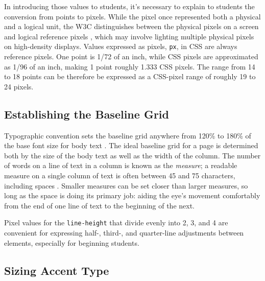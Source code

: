 \documentclass[sigplan,screen]{acmart}
\begin{document}
In introducing those values to students, it’s necessary to explain to students the conversion from points to pixels. While the pixel once represented both a physical and a logical unit, the W3C distinguishes between the physical pixels on a screen and logical reference pixels \cite[§~5.2]{w3c:values}, which may involve lighting multiple physical pixels on high-density displays. Values expressed as pixels, \verb|px|, in CSS are always reference pixels. One point is 1/72 of an inch, while CSS pixels are approximated as 1/96 of an inch, making 1 point roughly 1.333 CSS pixels. The range from 14 to 18 points can be therefore be expressed as a CSS-pixel range of roughly 19 to 24 pixels.

\subsection{Establishing the Baseline Grid}

Typographic convention sets the baseline grid anywhere from 120\% to 180\% of the base font size for body text \cite[p.~92]{jsm:owt}. The ideal baseline grid for a page is determined both by the size of the body text as well as the width of the column. The number of words on a line of text in a column is known as the {\itshape measure}; a readable measure on a single column of text is often between 45 and 75 characters, including spaces \cite[pp. 26–27]{rb:style}. Smaller measures can be set closer than larger measures, so long as the space is doing its primary job: aiding the eye's movement comfortably from the end of one line of text to the beginning of the next.

Pixel values for the \verb|line-height| that divide evenly into 2, 3, and 4 are convenient for  expressing half-, third-, and quarter-line adjustments between elements, especially for beginning students.

\subsection{Sizing Accent Type}
\end{document}

